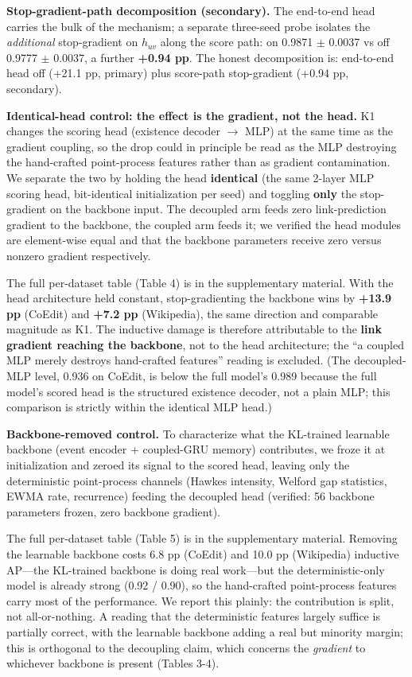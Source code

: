 \documentclass[conference]{IEEEtran}
\begin{document}
\textbf{Stop-gradient-path decomposition (secondary).} The end-to-end head carries the bulk of the mechanism; a separate three-seed probe isolates the \emph{additional} stop-gradient on \(h_{uv}\) along the score path: on 0.9871 $\pm$ 0.0037 vs off 0.9777 $\pm$ 0.0037, a further \textbf{+0.94 pp}. The honest decomposition is: end-to-end head off (+21.1 pp, primary) plus score-path stop-gradient (+0.94 pp, secondary).

\textbf{Identical-head control: the effect is the gradient, not the head.} K1 changes the scoring head (existence decoder $\rightarrow$ MLP) at the same time as the gradient coupling, so the drop could in principle be read as the MLP destroying the hand-crafted point-process features rather than as gradient contamination. We separate the two by holding the head \textbf{identical} (the same 2-layer MLP scoring head, bit-identical initialization per seed) and toggling \textbf{only} the stop-gradient on the backbone input. The decoupled arm feeds zero link-prediction gradient to the backbone, the coupled arm feeds it; we verified the head modules are element-wise equal and that the backbone parameters receive zero versus nonzero gradient respectively.

The full per-dataset table (Table 4) is in the supplementary material. With the head architecture held constant, stop-gradienting the backbone wins by \textbf{+13.9 pp} (CoEdit) and \textbf{+7.2 pp} (Wikipedia), the same direction and comparable magnitude as K1. The inductive damage is therefore attributable to the \textbf{link gradient reaching the backbone}, not to the head architecture; the ``a coupled MLP merely destroys hand-crafted features'' reading is excluded. (The decoupled-MLP level, 0.936 on CoEdit, is below the full model's 0.989 because the full model's scored head is the structured existence decoder, not a plain MLP; this comparison is strictly within the identical MLP head.)

\textbf{Backbone-removed control.} To characterize what the KL-trained learnable backbone (event encoder + coupled-GRU memory) contributes, we froze it at initialization and zeroed its signal to the scored head, leaving only the deterministic point-process channels (Hawkes intensity, Welford gap statistics, EWMA rate, recurrence) feeding the decoupled head (verified: 56 backbone parameters frozen, zero backbone gradient).

The full per-dataset table (Table 5) is in the supplementary material. Removing the learnable backbone costs 6.8 pp (CoEdit) and 10.0 pp (Wikipedia) inductive AP---the KL-trained backbone is doing real work---but the deterministic-only model is already strong (0.92 / 0.90), so the hand-crafted point-process features carry most of the performance. We report this plainly: the contribution is split, not all-or-nothing. A reading that the deterministic features largely suffice is partially correct, with the learnable backbone adding a real but minority margin; this is orthogonal to the decoupling claim, which concerns the \emph{gradient} to whichever backbone is present (Tables 3-4).
\end{document}
